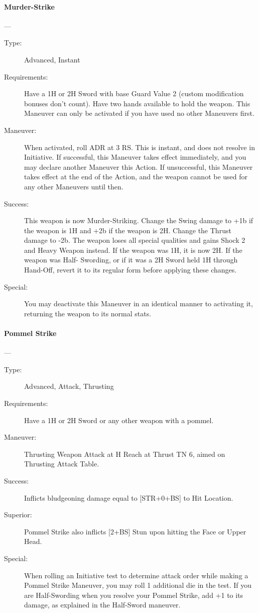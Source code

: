 \documentclass[oneside,11pt,english]{book}
\begin{document}
\paragraph{\large\label{man:Murder-Strike}Murder-Strike}---\quad{\large[2]}
\vspace{-10pt}\begin{description} 
\item [Type:] Advanced, Instant 
\item [Requirements:] Have a 1H or 2H Sword with base Guard Value 2 (custom modification bonuses don’t 
  count). Have two hands available to hold the weapon. This Maneuver can only be activated if you have 
  used no other Maneuvers first. 
\item [Maneuver:] When activated, roll ADR at 3 RS. This is instant, and does not resolve in Initiative. If 
  successful, this Maneuver takes effect immediately, and you may declare another Maneuver this Action. 
  If unsuccessful, this Maneuver takes effect at the end of the Action, and the weapon cannot be used for 
  any other Maneuvers until then. 
\item [Success:] This weapon is now Murder-Striking. Change the Swing damage to +1b if the weapon is 1H and 
  +2b if the weapon is 2H. Change the Thrust damage to -2b. The weapon loses all special qualities and 
  gains Shock 2 and Heavy Weapon instead. If the weapon was 1H, it is now 2H. If the weapon was Half-
  Swording, or if it was a 2H Sword held 1H through Hand-Off, revert it to its regular form before applying 
  these changes. 
\item [Special:] You may deactivate this Maneuver in an identical manner to activating it, returning the weapon 
  to its normal stats. 
\end{description}
\paragraph{\large\label{man:Pommel Strike}Pommel Strike}---\quad{\large[X]}
\vspace{-10pt}\begin{description} 
\item [Type:] Advanced, Attack, Thrusting 
\item [Requirements:] Have a 1H or 2H Sword or any other weapon with a pommel. 
\item [Maneuver:] Thrusting Weapon Attack at H Reach at Thrust TN 6, aimed on Thrusting Attack Table. 
\item [Success:] Inflicts bludgeoning damage equal to [STR+0+BS] to Hit Location. 
\item [Superior:] Pommel Strike also inflicts [2+BS] Stun upon hitting the Face or Upper Head. 
\item [Special:] When rolling an Initiative test to determine attack order while making a Pommel Strike 
  Maneuver, you may roll 1 additional die in the test. If you are Half-Swording when you resolve your 
  Pommel Strike, add +1 to its damage, as explained in the Half-Sword maneuver. 
\end{description}
\end{document}
